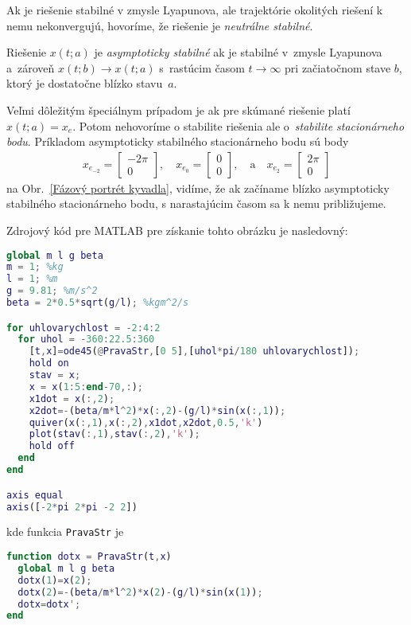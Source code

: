 \documentclass[a4paper, 10pt, ]{article}
\begin{document}
Ak je riešenie stabilné v zmysle Lyapunova, ale trajektórie okolitých riešení k nemu nekonvergujú, hovoríme, že riešenie je \emph{neutrálne stabilné}.


Riešenie $x(t;a)$ je \emph{asymptoticky stabilné} ak je stabilné v~zmysle Lyapunova a~zároveň $x(t;b) \to x(t;a)$ s~rastúcim časom $t \to \infty$ pri začiatočnom stave $b$, ktorý je dostatočne blízko stavu~$a$.













Veľmi dôležitým špeciálnym prípadom je ak pre skúmané riešenie platí $x(t;a) = x_e$. Potom nehovoríme o stabilite riešenia ale o~\emph{stabilite stacionárneho bodu}. Príkladom asymptoticky stabilného stacionárneho bodu sú body
\begin{align*}
	x_{e_{-2}} =
	\begin{bmatrix}
		-2\pi \\ 0
	\end{bmatrix},
	\quad
	x_{e_{0}} =
	\begin{bmatrix}
		0 \\ 0
	\end{bmatrix},
	\quad
	\text{a}
	\quad
	x_{e_{2}} =
	\begin{bmatrix}
		2 \pi \\ 0
	\end{bmatrix}
\end{align*}
na Obr.~\ref{Fázový portrét kyvadla}, vidíme, že ak začíname blízko asymptoticky stabilného stacionárneho bodu, s narastajúcim časom sa k nemu približujeme.

Zdrojový kód pre MATLAB pre získanie tohto obrázku je nasledovný:
\begin{lstlisting}[language=Matlab, title=Kód pre vygenerovanie obr.~\ref{Fázový portrét kyvadla}]
global m l g beta
m = 1; %kg
l = 1; %m
g = 9.81; %m/s^2
beta = 2*0.5*sqrt(g/l); %kgm^2/s

for uhlovarychlost = -2:4:2
  for uhol = -360:22.5:360
    [t,x]=ode45(@PravaStr,[0 5],[uhol*pi/180 uhlovarychlost]);
    hold on
    stav = x;
    x = x(1:5:end-70,:);
    x1dot = x(:,2);
    x2dot=-(beta/m*l^2)*x(:,2)-(g/l)*sin(x(:,1));
    quiver(x(:,1),x(:,2),x1dot,x2dot,0.5,'k')
    plot(stav(:,1),stav(:,2),'k');
    hold off
  end
end

axis equal
axis([-2*pi 2*pi -2 2])
\end{lstlisting}
kde funkcia \verb|PravaStr| je
\begin{lstlisting}[language=Matlab]
function dotx = PravaStr(t,x)
  global m l g beta
  dotx(1)=x(2);
  dotx(2)=-(beta/m*l^2)*x(2)-(g/l)*sin(x(1));
  dotx=dotx';
end
\end{lstlisting}
\end{document}

